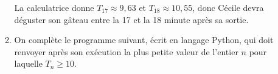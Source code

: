 \begin{enumerate}
\begin{enumerate}
La calculatrice donne $T_{17} \approx 9,63$ et $T_{18} \approx 10,55$, donc 
Cécile devra déguster son gâteau entre la 17 et la 18 minute après sa sortie.
\item On complète le programme suivant, écrit en langage Python, qui doit renvoyer après son exécution la plus petite valeur de l'entier $n$ pour laquelle $T_n \geqslant 10$.


\begin{center}
\end{center}


	\end{enumerate}
\end{enumerate}
 

